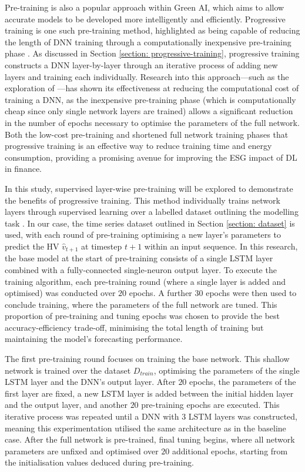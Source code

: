 \documentclass[a4paper, 11pt]{report}
\begin{document}
    Pre-training is also a popular approach within Green AI, which aims to allow accurate models to be developed more intelligently and efficiently. Progressive training is one such pre-training method, highlighted as being capable of reducing the length of DNN training through a computationally inexpensive pre-training phase \citep{xu-2021}. As discussed in Section \ref{section: progressive-training}, progressive training constructs a DNN layer-by-layer through an iterative process of adding new layers and training each individually. Research into this approach---such as the exploration of \citet{ienco-2019}---has shown its effectiveness at reducing the computational cost of training a DNN, as the inexpensive pre-training phase (which is computationally cheap since only single network layers are trained) allows a significant reduction in the number of epochs necessary to optimise the parameters of the full network. Both the low-cost pre-training and shortened full network training phases that progressive training is an effective way to reduce training time and energy consumption, providing a promising avenue for improving the ESG impact of DL in finance.

    In this study, supervised layer-wise pre-training will be explored to demonstrate the benefits of progressive training. This method individually trains network layers through supervised learning over a labelled dataset outlining the modelling task \citep{ienco-2019}. In our case, the time series dataset outlined in Section \ref{section: dataset} is used, with each round of pre-training optimising a new layer's parameters to predict the HV $\hat{v}_{t+1}$ at timestep $t+1$ within an input sequence. In this research, the base model at the start of pre-training consists of a single LSTM layer combined with a fully-connected single-neuron output layer. To execute the training algorithm, each pre-training round (where a single layer is added and optimised) was conducted over $20$ epochs. A further $30$ epochs were then used to conclude training, where the parameters of the full network are tuned. This proportion of pre-training and tuning epochs was chosen  to provide the best accuracy-efficiency trade-off, minimising the total length of training but maintaining the model's forecasting performance. 

    The first pre-training round focuses on training the base network. This shallow network is trained over the dataset $D_{train}$, optimising the parameters of the single LSTM layer and the DNN's output layer. After $20$ epochs, the parameters of the first layer are fixed, a new LSTM layer is added between the initial hidden layer and the output layer, and another $20$ pre-training epochs are executed. This iterative process was repeated until a DNN with $3$ LSTM layers was constructed, meaning this experimentation utilised the same architecture as in the baseline case. After the full network is pre-trained, final tuning begins, where all network parameters are unfixed and optimised over $20$ additional epochs, starting from the initialisation values deduced during pre-training.
\end{document}
